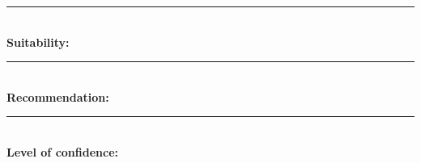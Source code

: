 \documentclass[12pt, a4paper]{article}
\newcommand{\myhline}[0]{\par\noindent\rule{\textwidth}{0.4pt}\\}
\begin{document}

\myhline
{\normalsize \textbf{Suitability:}}
\quad


\myhline
{\normalsize \textbf{Recommendation:}}
\quad


\myhline
{\normalsize \textbf{Level of confidence:}}
\quad


% 
% 
\end{document}

